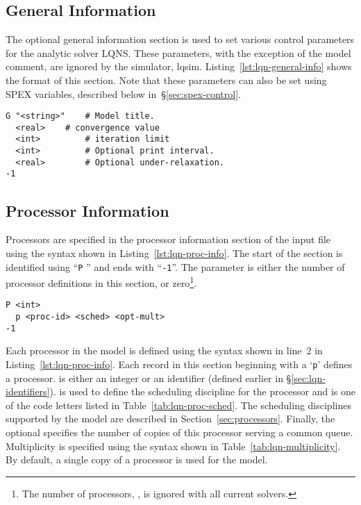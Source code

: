 \subsection{General Information}
\label{sec:lqn-general-information}

The optional general information section is used to set various control parameters for the analytic solver
LQNS.  These parameters, with the exception of the model comment, are ignored by the
simulator, lqsim.  Listing~\ref{lst:lqn-general-info} shows the format of this section.  Note that these
parameters can also be set using SPEX variables, described below
in~\S\ref{sec:spex-control}.

\lstset{language=LQN,basicstyle=\ttfamily,numbersep=10pt,firstnumber=1}
\begin{lstlisting}[caption={General Information},label=lst:lqn-general-info,frame=single]
G "<string>"	# Model title.
  <real> 	# convergence value
  <int>         # iteration limit
  <int>         # Optional print interval.
  <real>        # Optional under-relaxation.
-1
\end{lstlisting}

\subsection{Processor Information}
\label{sec:lqn-processor-information}

Processors are specified in the processor information section of the input file using
the syntax shown in Listing~\ref{lst:lqn-proc-info}.  The start of the section is identified using
``\texttt{P} '' and ends with ``\texttt{-1}''.  The  parameter is either
the number of processor definitions in this section, or zero\footnote{The number of processors,
  , is ignored with all current solvers.}.

\lstset{language=LQN,basicstyle=\ttfamily,numbersep=10pt,firstnumber=1}
\begin{lstlisting}[caption={Processor Information},label=lst:lqn-proc-info,frame=single]
P <int>
  p <proc-id> <sched> <opt-mult>
-1
\end{lstlisting}

Each processor in the model is defined using the syntax shown in line~2 in Listing~\ref{lst:lqn-proc-info}.
Each record in this section beginning with a `\texttt{p}' defines a processor.  is
either an integer or an identifier (defined earlier in \S\ref{sec:lqn-identifiers}).   is
used to define the scheduling discipline for the processor and is one of the code letters listed in
Table~\ref{tab:lqn-proc-sched}.  The scheduling disciplines supported by the model are described in
Section~\ref{sec:processors}.  Finally, the optional  specifies the number of copies
of this processor serving a common queue.  Multiplicity is specified using the syntax shown in
Table~\ref{tab:lqn-multiplicity}.  By default, a single copy of a processor is used for the model.

